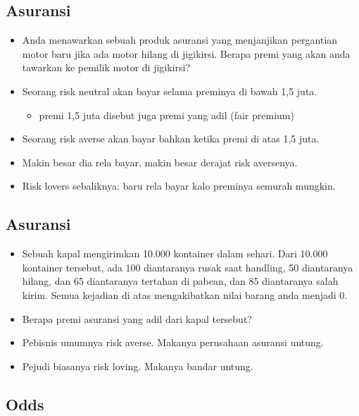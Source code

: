 \documentclass[
  letterpaper,
  DIV=11,
  numbers=noendperiod]{scrartcl}
\providecommand{\tightlist}{%
  \setlength{\itemsep}{0pt}\setlength{\parskip}{0pt}}\usepackage{longtable,booktabs,array}
\begin{document}
\hypertarget{asuransi-1}{%
\subsection{Asuransi}\label{asuransi-1}}

\begin{itemize}
\item
  Anda menawarkan sebuah produk asuransi yang menjanjikan pergantian
  motor baru jika ada motor hilang di jigikirsi. Berapa premi yang akan
  anda tawarkan ke pemilik motor di jigikirsi?
\item
  Seorang risk neutral akan bayar selama preminya di bawah 1,5 juta.

  \begin{itemize}
  \tightlist
  \item
    premi 1,5 juta disebut juga premi yang adil (fair premium)
  \end{itemize}
\item
  Seorang risk averse akan bayar bahkan ketika premi di atas 1,5 juta.
\item
  Makin besar dia rela bayar, makin besar derajat risk aversenya.
\item
  Risk lovers sebaliknya: baru rela bayar kalo preminya semurah mungkin.
\end{itemize}

\hypertarget{asuransi-2}{%
\subsection{Asuransi}\label{asuransi-2}}

\begin{itemize}
\item
  Sebuah kapal mengirimkan 10.000 kontainer dalam sehari. Dari 10.000
  kontainer tersebut, ada 100 diantaranya rusak saat handling, 50
  diantaranya hilang, dan 65 diantaranya tertahan di pabean, dan 85
  diantaranya salah kirim. Semua kejadian di atas mengakibatkan nilai
  barang anda menjadi 0.
\item
  Berapa premi asuransi yang adil dari kapal tersebut?
\item
  Pebisnis umumnya risk averse. Makanya perusahaan asuransi untung.
\item
  Pejudi biasanya risk loving. Makanya bandar untung.
\end{itemize}

\hypertarget{odds}{%
\subsection{Odds}\label{odds}}
\end{document}
